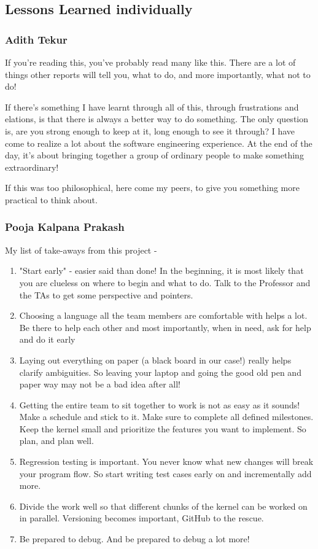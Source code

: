 \documentclass[a4paper]{article}
\begin{document}
\subsection{Lessons Learned individually}
\subsubsection{Adith Tekur}
If you're reading this, you've probably read many like this. There are a lot of things other reports will tell you, what to do, and more importantly, what not to do! 

If there’s something I have learnt through all of this, through frustrations and elations, is that there is always a better way to do something. The only question is, are you strong enough to keep at it, long enough to see it through? I have come to realize a lot about the software engineering experience. At the end of the day, it’s about bringing together a group of ordinary people to make something extraordinary!

If this was too philosophical, here come my peers, to give you something more practical to think about.


\subsubsection{Pooja Kalpana Prakash}
My list of take-aways from this project -
\begin {enumerate}
\item "Start early" - easier said than done! In the beginning, it is most likely that you are clueless on where to begin and what to do. Talk to the Professor and the TAs to get some perspective and pointers.
\item Choosing a language all the team members are comfortable with helps a lot. Be there to help each other and most importantly, when in need, ask for help and do it early
\item Laying out everything on paper (a black board in our case!) really helps clarify ambiguities. So leaving your laptop and going the good old pen and paper way may not be a bad idea after all!
\item Getting the entire team to sit together to work is not as easy as it sounds! Make a schedule and stick to it. Make sure to complete all defined milestones. Keep the kernel small and prioritize the features you want to implement. So plan, and plan well.
\item Regression testing is important. You never know what new changes will break your program flow. So start writing test cases early on and incrementally add more.
\item Divide the work well so that different chunks of the kernel can be worked on in parallel. Versioning becomes important, GitHub to the rescue. 
\item Be prepared to debug. And be prepared to debug a lot more!
\end{enumerate}
\end{document}

